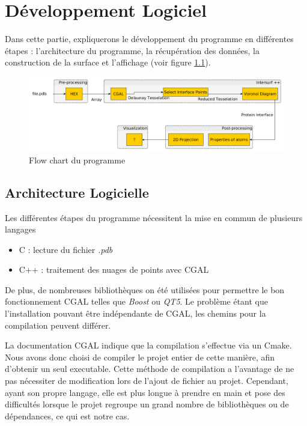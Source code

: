 \chapter{Développement Logiciel}

Dans cette partie, expliquerons le développement du programme en différentes étapes :
l'architecture du programme, la récupération des données, la construction de la surface
et l'affichage (voir figure \ref{fig::flow_chart}).

\begin{figure}[ht]
\centering
  \includegraphics[width=\textwidth]{figures/flow_chart.png}
  \caption{Flow chart du programme}
  \label{fig::flow_chart}
\end{figure}

\section{Architecture Logicielle}

Les différentes étapes du programme nécessitent la mise en commun de plusieurs langages
\begin{itemize}
  \item C : lecture du fichier \textit{.pdb}
  \item C++ : traitement des nuages de points avec CGAL
\end{itemize}
De plus, de nombreuses bibliothèques on été utilisées pour permettre le bon fonctionnement
CGAL telles que \textit{Boost} ou \textit{QT5}. Le problème étant que l'installation pouvant
être indépendante de CGAL, les chemins pour la compilation peuvent différer.

La documentation CGAL indique que la compilation s'effectue via un Cmake. Nous avons donc choisi
de compiler le projet entier de cette manière, afin d'obtenir un seul executable.
Cette méthode de compilation a l'avantage de ne pas nécessiter de modification lors de l'ajout
de fichier au projet. Cependant, ayant son propre langage, elle est plus longue à prendre en
main et pose des difficultés lorsque le projet regroupe un grand nombre de bibliothèques
ou de dépendances, ce qui est notre cas.



